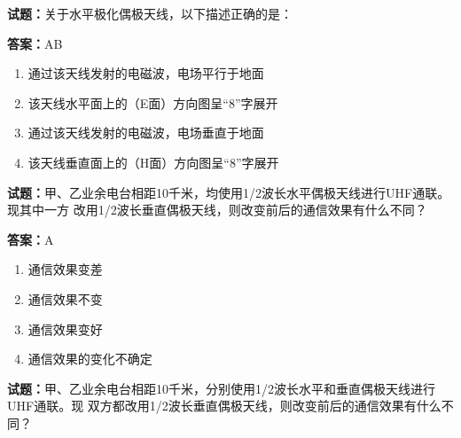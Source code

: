 \documentclass{ctexbook}
\begin{document}





\vspace{1em}

\textbf{试题：}关于水平极化偶极天线，以下描述正确的是： 

\textbf{答案：}AB 

\begin{enumerate}[leftmargin=3em]
  \item 通过该天线发射的电磁波，电场平行于地面 

  \item 该天线水平面上的（E面）方向图呈“8”字展开 

  \item 通过该天线发射的电磁波，电场垂直于地面 

  \item 该天线垂直面上的（H面）方向图呈“8”字展开 

\end{enumerate}





\vspace{1em}

\textbf{试题：}甲、乙业余电台相距10千米，均使用1/2波长水平偶极天线进行UHF通联。现其中一方
改用1/2波长垂直偶极天线，则改变前后的通信效果有什么不同？ 

\textbf{答案：}A 

\begin{enumerate}[leftmargin=3em]
  \item 通信效果变差 

  \item 通信效果不变 

  \item 通信效果变好 

  \item 通信效果的变化不确定 

\end{enumerate}





\vspace{1em}

\textbf{试题：}甲、乙业余电台相距10千米，分别使用1/2波长水平和垂直偶极天线进行UHF通联。现
双方都改用1/2波长垂直偶极天线，则改变前后的通信效果有什么不同？ 
\end{document}
